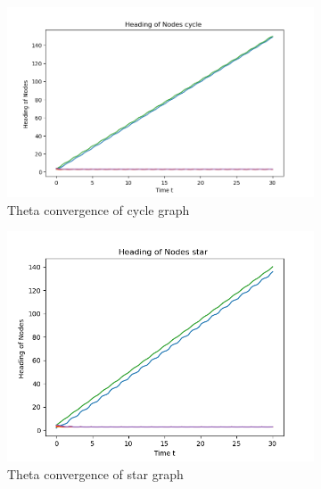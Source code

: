 \documentclass{article}
\begin{document}
\begin{problem}
    \begin{figure}[!ht]
        \centering
        \begin{subfigure}{0.35\textwidth}
            \includegraphics[width=\textwidth]{./img/p3_cycle3.png}
            \caption{Theta convergence of cycle graph }
        \end{subfigure}
        \begin{subfigure}{0.35\textwidth}
            \includegraphics[width=\textwidth]{./img/p3_star3.png}
            \caption{Theta convergence of star graph }
        \end{subfigure}
        \begin{subfigure}{0.35\textwidth}

\end{subfigure}
\end{figure}
\end{problem}
\end{document}
